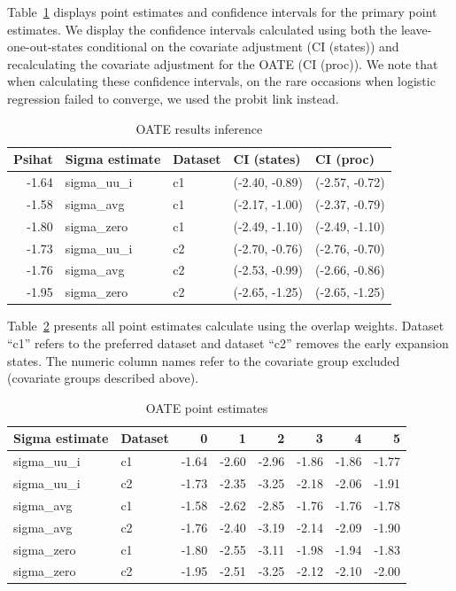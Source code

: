\documentclass[12pt]{article}
\begin{document}
Table~\ref{tab:oateconfint} displays point estimates and confidence intervals for the primary point estimates. We display the confidence intervals calculated using both the leave-one-out-states conditional on the covariate adjustment (CI (states)) and recalculating the covariate adjustment for the OATE (CI (proc)). We note that when calculating these confidence intervals, on the rare occasions when logistic regression failed to converge, we used the probit link instead.

\begin{table}[ht]
\centering
\begin{tabular}{rllll}
  \toprule
Psihat & Sigma estimate & Dataset & CI (states) & CI (proc) \\ 
  \midrule
-1.64 & sigma\_uu\_i & c1 & (-2.40, -0.89) & (-2.57, -0.72) \\ 
  -1.58 & sigma\_avg & c1 & (-2.17, -1.00) & (-2.37, -0.79) \\ 
  -1.80 & sigma\_zero & c1 & (-2.49, -1.10) & (-2.49, -1.10) \\ 
  -1.73 & sigma\_uu\_i & c2 & (-2.70, -0.76) & (-2.76, -0.70) \\ 
  -1.76 & sigma\_avg & c2 & (-2.53, -0.99) & (-2.66, -0.86) \\ 
  -1.95 & sigma\_zero & c2 & (-2.65, -1.25) & (-2.65, -1.25) \\ 
   \bottomrule
\end{tabular}
\caption{OATE results inference}
\label{tab:oateconfint}
\end{table}

Table~\ref{tab:oatesensitive} presents all point estimates calculate using the overlap weights. Dataset ``c1'' refers to the preferred dataset and dataset ``c2'' removes the early expansion states. The numeric column names refer to the covariate group excluded (covariate groups described above).

\begin{table}[ht]
\centering
\begin{tabular}{llrrrrrr}
  \toprule
Sigma estimate & Dataset & 0 & 1 & 2 & 3 & 4 & 5 \\ 
  \midrule
sigma\_uu\_i & c1 & -1.64 & -2.60 & -2.96 & -1.86 & -1.86 & -1.77 \\ 
  sigma\_uu\_i & c2 & -1.73 & -2.35 & -3.25 & -2.18 & -2.06 & -1.91 \\ 
  sigma\_avg & c1 & -1.58 & -2.62 & -2.85 & -1.76 & -1.76 & -1.78 \\ 
  sigma\_avg & c2 & -1.76 & -2.40 & -3.19 & -2.14 & -2.09 & -1.90 \\ 
  sigma\_zero & c1 & -1.80 & -2.55 & -3.11 & -1.98 & -1.94 & -1.83 \\ 
  sigma\_zero & c2 & -1.95 & -2.51 & -3.25 & -2.12 & -2.10 & -2.00 \\ 
   \bottomrule
\end{tabular}
\caption{OATE point estimates}
\label{tab:oatesensitive}
\end{table}
\end{document}
